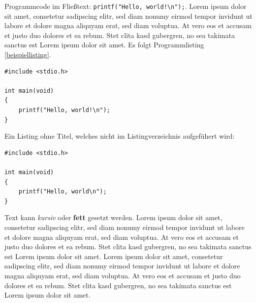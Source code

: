 Programmcode im Fließtext: \lstinline{printf("Hello, world!\n");}.
Lorem ipsum dolor sit amet, consetetur sadipscing elitr, sed diam nonumy eirmod tempor invidunt ut labore et dolore magna aliquyam erat, sed diam voluptua. At vero eos et accusam et justo duo dolores et ea rebum. Stet clita kasd gubergren, no sea takimata sanctus est Lorem ipsum dolor sit amet.
Es folgt Programmlisting \ref{beispiellisting}.

\begin{lstlisting}[caption={Beschreibung des Listings.}, label=beispiellisting, frame=tblr]
#include <stdio.h>

int main(void)
{
    printf("Hello, world!\n");
}
\end{lstlisting}
Ein Listing ohne Titel, welches nicht im Listingverzeichnis aufgefühert wird:

\begin{lstlisting}[numbers=none]
#include <stdio.h>

int main(void)
{
    printf("Hello, world\n");
}
\end{lstlisting}

Text kann \emph{kursiv} oder \textbf{fett} gesetzt werden.
Lorem ipsum dolor sit amet, consetetur sadipscing elitr, sed diam nonumy eirmod tempor invidunt ut labore et dolore magna aliquyam erat, sed diam voluptua. At vero eos et accusam et justo duo dolores et ea rebum. Stet clita kasd gubergren, no sea takimata sanctus est Lorem ipsum dolor sit amet. Lorem ipsum dolor sit amet, consetetur sadipscing elitr, sed diam nonumy eirmod tempor invidunt ut labore et dolore magna aliquyam erat, sed diam voluptua. At vero eos et accusam et justo duo dolores et ea rebum. Stet clita kasd gubergren, no sea takimata sanctus est Lorem ipsum dolor sit amet.
